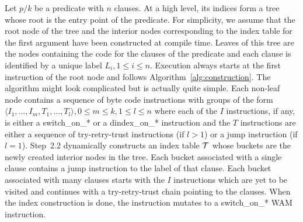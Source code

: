 \documentclass{llncs}
\newcommand{\instr}[1]{\textsf{#1}}
\newcommand{\TryRetryTrust}{\mbox{\instr{try-retry-trust}}\xspace}
\newcommand{\jump}{\instr{jump}\xspace}
\newcommand{\jitiSTAR}{\mbox{\instr{dindex\_on\_*}}\xspace}
\newcommand{\switchSTAR}{\mbox{\instr{switch\_on\_*}}\xspace}
\begin{document}
Let $p/k$ be a predicate with $n$ clauses.
%
At a high level, its indices form a tree whose root is the entry point
of the predicate. For simplicity, we assume that the root node of the
tree and the interior nodes corresponding to the index table for the
first argument have been constructed at compile time. Leaves of this
tree are the nodes containing the code for the clauses of the
predicate and each clause is identified by a unique label \mbox{$L_i,
1 \leq i \leq n$}. Execution always starts at the first instruction of
the root node and follows Algorithm~\ref{alg:construction}. The
algorithm might look complicated but is actually quite simple.
%
Each non-leaf node contains a sequence of byte code instructions with
groups of the form \mbox{$\langle I_1, \ldots, I_m, T_1, \ldots, T_l
\rangle, 0 \leq m \leq k, 1 \leq l \leq n$} where each of the $I$
instructions, if any, is either a \switchSTAR or a \jitiSTAR
instruction and the $T$ instructions are either a sequence of
\TryRetryTrust instructions (if $l > 1$) or a \jump instruction (if
\mbox{$l = 1$}). Step~2.2 dynamically constructs an index table $\cal
T$ whose buckets are the newly created interior nodes in the tree.
Each bucket associated with a single clause contains a \jump
instruction to the label of that clause. Each bucket associated with
many clauses starts with the $I$ instructions which are yet to be
visited and continues with a \TryRetryTrust chain pointing to the
clauses. When the index construction is done, the instruction mutates
to a \switchSTAR WAM instruction.
\end{document}
